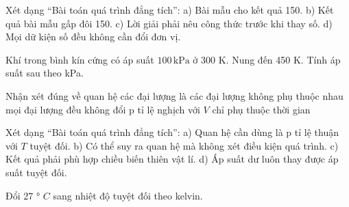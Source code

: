 \begin{ex}
Xét dạng “Bài toán quá trình đẳng tích”: a) Bài mẫu cho kết quả 150. b) Kết quả bài mẫu gấp đôi 150. c) Lời giải phải nêu công thức trước khi thay số. d) Mọi dữ kiện số đều không cần đổi đơn vị.
\choiceTF

\end{ex}

\begin{ex}
Khí trong bình kín cứng có áp suất $100\,\text{kPa}$ ở 300 K. Nung đến 450 K. Tính áp suất sau theo kPa.
\end{ex}

\begin{ex}
Nhận xét đúng về quan hệ các đại lượng là
\choice
{các đại lượng không phụ thuộc nhau}
{mọi đại lượng đều không đổi}
{\True p tỉ lệ nghịch với $V$}
{chỉ phụ thuộc thời gian}
\end{ex}

\begin{ex}
Xét dạng “Bài toán quá trình đẳng tích”: a) Quan hệ cần dùng là p tỉ lệ thuận với $T$ tuyệt đối. b) Có thể suy ra quan hệ mà không xét điều kiện quá trình. c) Kết quả phải phù hợp chiều biến thiên vật lí. d) Áp suất dư luôn thay được áp suất tuyệt đối.
\choiceTF

\end{ex}

\begin{ex}
Đổi 27 ° $C$ sang nhiệt độ tuyệt đối theo kelvin.
\end{ex}

